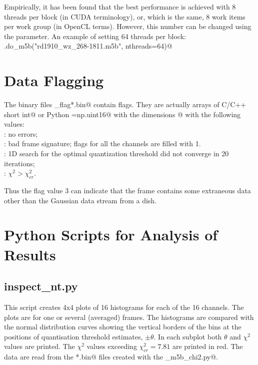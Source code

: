 \documentclass[letterpaper,twoside,12pt]{article}
\begin{document}
Empirically, it has been found that the best performance is achieved 
with 8 threads per block (in CUDA terminology), or, which is the same, 
8 work items per work group (in OpenCL terms). However, this number can 
be changed using the \verb@nthreads@ parameter. An example of setting 64 threads per block: \\

\noindent \verb@nt.do_m5b("rd1910_wz_268-1811.m5b", nthreads=64)@ \\


\section{Data Flagging}

The binary files \verb@nt_flag*.bin@ contain flags. They are actually arrays of C/C++ \verb@unsigned short int@ or Python \verb@dtype=np.uint16@ with the dimensions \verb@[n_frames,16]@ with the following values: \\
 
: no errors; \\
: bad frame signature; flags for all the channels are filled with 1.  \\
: 1D search for the optimal quantization threshold did not converge in 20 iterations; \\
: $\chi^2 > \chi^2_{cr}$.

Thus the flag value 3 can indicate that the frame contains some extraneous data other than the Gaussian data stream from a dish. 


\section{Python Scripts for Analysis of Results}

\subsection{inspect\_nt.py}

This script creates 4x4 plots of 16 histograms for each of the 16 channels. The plots are for one or several (averaged) frames. The histograms are compared with the normal distribution curves showing the vertical borders of the bins at the positions of quantisation threshold estimates, $\pm\theta$. In each subplot both $\theta$ and $\chi^2$ values are printed. The $\chi^2$ values exceeding $\chi^2_{cr} = 7.81$ are printed in red. The data are read from the \verb@*.bin@ files created with the \verb@gpu_m5b_chi2.py@. \\
\end{document}
